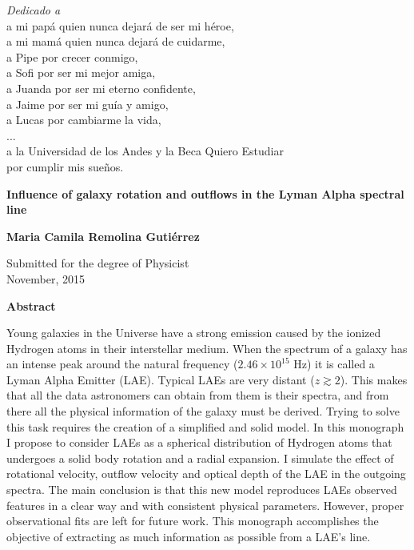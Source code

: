 \newpage
\thispagestyle{empty}
\begin{center}
\vspace*{2cm}
\textit{\LARGE {Dedicado a}}\\ 
a mi pap\'a quien nunca dejar\'a de ser mi h\'eroe, \\ 
a mi mam\'a quien nunca dejar\'a de cuidarme, \\
a Pipe por crecer conmigo, \\
a Sofi por ser mi mejor amiga, \\ 
a Juanda por ser mi eterno confidente, \\ 
a Jaime por ser mi gu\'ia y amigo, \\
a Lucas por cambiarme la vida, \\
...\\
a la Universidad de los Andes y la Beca Quiero Estudiar\\por cumplir mis sue\~nos. \\

\end{center}

\newpage
\thispagestyle{empty}
\begin{center}
  \textbf{\Large Influence of galaxy rotation and outflows in the Lyman Alpha spectral line}

  \vspace*{1cm}
  \textbf{\large Maria Camila Remolina Guti\'errez}

  \vspace*{0.5cm}
  {\large Submitted for the degree of Physicist\\ November, 2015}

  \vspace*{1cm}
  \textbf{\large Abstract}
\end{center}
Young galaxies in the Universe have a strong \lya emission caused by the ionized Hydrogen atoms in their interstellar medium. When the spectrum of a galaxy has an intense peak around the \lya natural frequency ($2.46\times 10^{15}$ Hz) it is called a Lyman Alpha Emitter (LAE). Typical LAEs are very distant ($z \gtrsim 2$). This makes that all the data astronomers can obtain from them is their spectra, and from there all the physical information of the galaxy must be derived. Trying to solve this task requires the creation of a simplified and solid model. In this monograph I propose to consider LAEs as a spherical distribution of Hydrogen atoms that undergoes a solid body rotation and a radial expansion. I simulate the effect of rotational velocity, outflow velocity and optical depth of the LAE in the outgoing spectra. The main conclusion is that this new model reproduces LAEs observed features in a clear way and with consistent physical parameters. However, proper observational fits are left for future work. This monograph accomplishes the objective of extracting as much information as possible from a LAE's \lya line.\\ 

